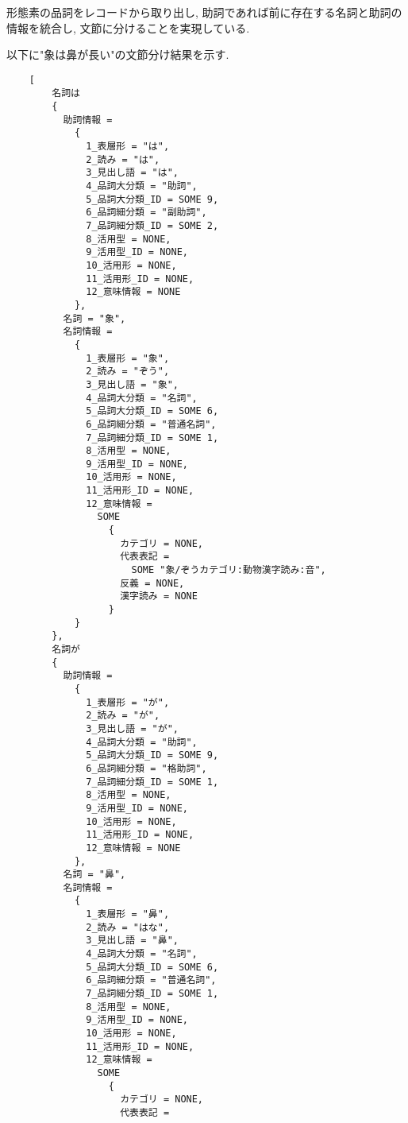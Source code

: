 \documentclass{jreport}
\begin{document}
形態素の品詞をレコードから取り出し, 助詞であれば前に存在する名詞と助詞の情報を統合し, 文節に分けることを実現している.

以下に"象は鼻が長い"の文節分け結果を示す.

\begin{verbatim}
    [
        名詞は
        {
          助詞情報 =
            {
              1_表層形 = "は",
              2_読み = "は",
              3_見出し語 = "は",
              4_品詞大分類 = "助詞",
              5_品詞大分類_ID = SOME 9,
              6_品詞細分類 = "副助詞",
              7_品詞細分類_ID = SOME 2,
              8_活用型 = NONE,
              9_活用型_ID = NONE,
              10_活用形 = NONE,
              11_活用形_ID = NONE,
              12_意味情報 = NONE
            },
          名詞 = "象",
          名詞情報 =
            {
              1_表層形 = "象",
              2_読み = "ぞう",
              3_見出し語 = "象",
              4_品詞大分類 = "名詞",
              5_品詞大分類_ID = SOME 6,
              6_品詞細分類 = "普通名詞",
              7_品詞細分類_ID = SOME 1,
              8_活用型 = NONE,
              9_活用型_ID = NONE,
              10_活用形 = NONE,
              11_活用形_ID = NONE,
              12_意味情報 =
                SOME
                  {
                    カテゴリ = NONE,
                    代表表記 =
                      SOME "象/ぞうカテゴリ:動物漢字読み:音",
                    反義 = NONE,
                    漢字読み = NONE
                  }
            }
        },
        名詞が
        {
          助詞情報 =
            {
              1_表層形 = "が",
              2_読み = "が",
              3_見出し語 = "が",
              4_品詞大分類 = "助詞",
              5_品詞大分類_ID = SOME 9,
              6_品詞細分類 = "格助詞",
              7_品詞細分類_ID = SOME 1,
              8_活用型 = NONE,
              9_活用型_ID = NONE,
              10_活用形 = NONE,
              11_活用形_ID = NONE,
              12_意味情報 = NONE
            },
          名詞 = "鼻",
          名詞情報 =
            {
              1_表層形 = "鼻",
              2_読み = "はな",
              3_見出し語 = "鼻",
              4_品詞大分類 = "名詞",
              5_品詞大分類_ID = SOME 6,
              6_品詞細分類 = "普通名詞",
              7_品詞細分類_ID = SOME 1,
              8_活用型 = NONE,
              9_活用型_ID = NONE,
              10_活用形 = NONE,
              11_活用形_ID = NONE,
              12_意味情報 =
                SOME
                  {
                    カテゴリ = NONE,
                    代表表記 =

\end{verbatim}
\end{document}
